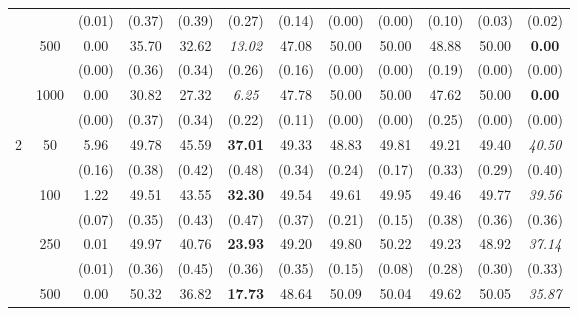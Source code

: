 \documentclass[twoside]{article}
\newcommand{\0}{\mathbf{0}}
\newcommand{\1}{\mathbf{1}}
\numberwithin{equation}{section}
\begin{document}
\begin{table}[t]
\begin{tabular}{|c|c|c|c|c|c|c|c|c|c|c|c|}
    &  & (0.01) & (0.37)                   & (0.39)                   & (0.27)                   & (0.14) & (0.00)    & (0.00)    & (0.10)  & (0.03) & (0.02) \\ \cline{2-12}
    & \multirow{2}{*}{500}  & 0.00   & 35.70                     & 32.62                    & {\it 13.02}                    & 47.08  & 50.00     & 50.00     & 48.88  & 50.00     & {\bf 0.00}  \\
    &  & (0.00)    & (0.36)                   & (0.34)                   & (0.26)                   & (0.16) & (0.00)    & (0.00)    & (0.19) & (0.00)    & (0.00)    \\ \cline{2-12}
    & \multirow{2}{*}{1000} & 0.00   & 30.82                    & 27.32                    & {\it 6.25}                     & 47.78  & 50.00     & 50.00     & 47.62  & 50.00     & {\bf 0.00}      \\
    & & (0.00)    & (0.37)                   & (0.34)                   & (0.22)                   & (0.11) & (0.00)    & (0.00)    & (0.25) & (0.00)    & (0.00)    \\ \hline
\multirow{10}{*}{2}    & \multirow{2}{*}{50}   & 5.96   & 49.78                    & 45.59                    & {\bf 37.01}                    & 49.33  & 48.83  & 49.81  & 49.21  & 49.40   & {\it 40.50}   \\
    &   & (0.16) & (0.38)                   & (0.42)                   & (0.48)                   & (0.34) & (0.24) & (0.17) & (0.33) & (0.29) & (0.40)  \\ \cline{2-12}
    & \multirow{2}{*}{100}  & 1.22   & 49.51                    & 43.55                    & {\bf 32.30}                     & 49.54  & 49.61  & 49.95  & 49.46  & 49.77  & {\it 39.56}  \\
    &  & (0.07) & (0.35)                   & (0.43)                   & (0.47)                   & (0.37) & (0.21) & (0.15) & (0.38) & (0.36) & (0.36) \\ \cline{2-12}
    & \multirow{2}{*}{250}  & 0.01   & 49.97                    & 40.76                    & {\bf 23.93}                    & 49.20   & 49.80   & 50.22  & 49.23  & 48.92  & {\it 37.14}  \\
    &  & (0.01) & (0.36)                   & (0.45)                   & (0.36)                   & (0.35) & (0.15) & (0.08) & (0.28) & (0.30)  & (0.33) \\ \cline{2-12}
    & \multirow{2}{*}{500}  & 0.00      & 50.32                    & 36.82                    & {\bf 17.73}                    & 48.64  & 50.09  & 50.04  & 49.62  & 50.05  & {\it 35.87}  \\

\end{tabular}
\end{table}
\end{document}
